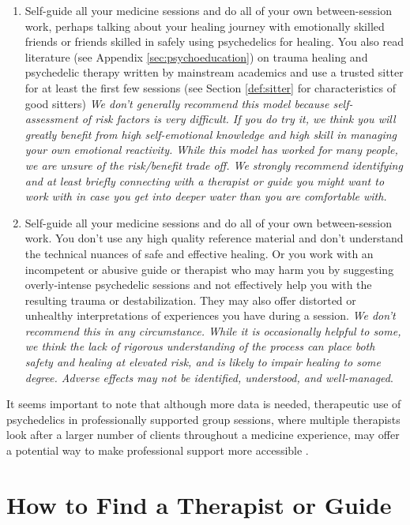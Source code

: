 \documentclass[12pt,letterpaper]{book}
\begin{document}
\begin{enumerate}
    \item Self-guide all your medicine sessions and do all of your own between-session work, perhaps talking about your healing journey with emotionally skilled friends or friends skilled in safely using psychedelics for healing. You also read literature (see Appendix \ref{sec:psychoeducation}) on trauma healing and psychedelic therapy written by mainstream academics and use a trusted sitter for at least the first few sessions (see Section \ref{def:sitter} for characteristics of good sitters) \textit{We don't generally recommend this model because self-assessment of risk factors is very difficult. If you do try it, we think you will greatly benefit from high self-emotional knowledge and high skill in managing your own emotional reactivity. While this model has worked for many people, we are unsure of the risk/benefit trade off. We strongly recommend identifying and at least briefly connecting with a therapist or guide you might want to work with in case you get into deeper water than you are comfortable with.}
    \item Self-guide all your medicine sessions and do all of your own between-session work. You don't use any high quality reference material and don't understand the technical nuances of safe and effective healing. Or you work with an incompetent or abusive guide or therapist who may harm you by suggesting overly-intense psychedelic sessions and not effectively help you with the resulting trauma or destabilization. They may also offer distorted or unhealthy interpretations of experiences you have during a session. \textit{We don't recommend this in any circumstance. While it is occasionally helpful to some, we think the lack of rigorous understanding of the process can place both safety and healing at elevated risk, and is likely to impair healing to some degree. Adverse effects may not be identified, understood, and well-managed}.
\end{enumerate}
It seems important to note that although more data is needed, therapeutic use of psychedelics in professionally supported group sessions, where multiple therapists look after a larger number of clients throughout a medicine experience, may offer a potential way to make professional support more accessible \cite{marseille2023group}.

\section{How to Find a Therapist or Guide}
\label{sec:howtofind}
\end{document}
